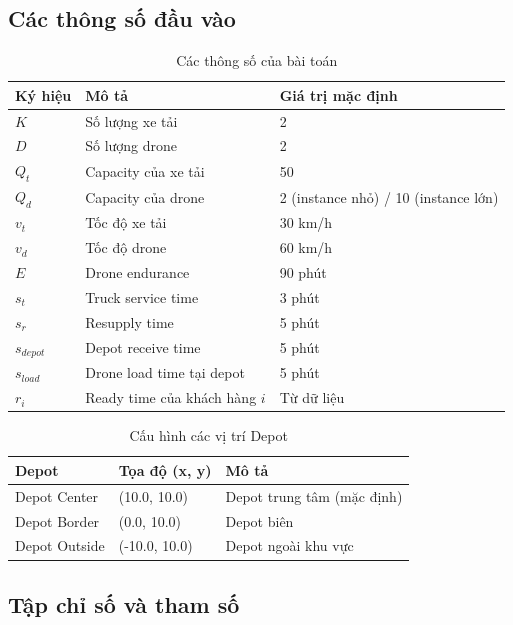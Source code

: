 \documentclass[12pt,a4paper]{article}
\begin{document}
\subsection{Các thông số đầu vào}

\begin{table}[H]
\centering
\caption{Các thông số của bài toán}
\begin{tabular}{lll}
\toprule
\textbf{Ký hiệu} & \textbf{Mô tả} & \textbf{Giá trị mặc định} \\
\midrule
$K$ & Số lượng xe tải & 2 \\
$D$ & Số lượng drone & 2 \\
$Q_t$ & Capacity của xe tải & 50 \\
$Q_d$ & Capacity của drone & 2 (instance nhỏ) / 10 (instance lớn) \\
$v_t$ & Tốc độ xe tải & 30 km/h \\
$v_d$ & Tốc độ drone & 60 km/h \\
$E$ & Drone endurance & 90 phút \\
$s_t$ & Truck service time & 3 phút \\
$s_r$ & Resupply time & 5 phút \\
$s_{depot}$ & Depot receive time & 5 phút \\
$s_{load}$ & Drone load time tại depot & 5 phút \\
$r_i$ & Ready time của khách hàng $i$ & Từ dữ liệu \\
\bottomrule
\end{tabular}
\end{table}

\begin{table}[H]
\centering
\caption{Cấu hình các vị trí Depot}
\begin{tabular}{lll}
\toprule
\textbf{Depot} & \textbf{Tọa độ (x, y)} & \textbf{Mô tả} \\
\midrule
Depot Center & (10.0, 10.0) & Depot trung tâm (mặc định) \\
Depot Border & (0.0, 10.0) & Depot biên \\
Depot Outside & (-10.0, 10.0) & Depot ngoài khu vực \\
\bottomrule
\end{tabular}
\end{table}

\subsection{Tập chỉ số và tham số}
\end{document}
